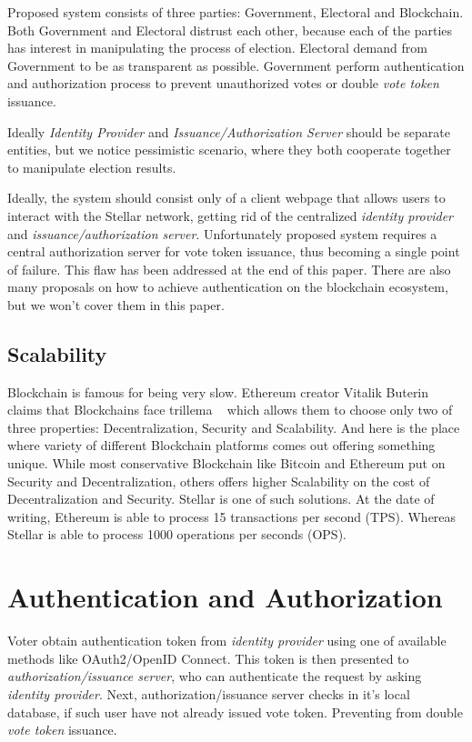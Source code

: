 \documentclass[runningheads]{llncs}
\begin{document}
Proposed system consists of three parties: Government, Electoral and Blockchain. Both Government and Electoral distrust each other, because each of the parties has interest in manipulating the process of election. Electoral demand from Government to be as transparent as possible. Government perform authentication and authorization process to prevent unauthorized votes or double \textit{vote token} issuance.

Ideally \textit{Identity Provider} and \textit{Issuance/Authorization Server} should be separate entities, but we notice pessimistic scenario, where they both cooperate together to manipulate election results.

Ideally, the system should consist only of a client webpage that allows users to interact with the Stellar network, getting rid of the centralized \textit{identity provider} and \textit{issuance/authorization server}. Unfortunately proposed system requires a central authorization server for vote token issuance, thus becoming a single point
of failure. This flaw has been addressed at the end of this paper. There are also many proposals on how to achieve authentication on the blockchain ecosystem, but we won't cover them in this paper.

\subsection{Scalability}

Blockchain is famous for being very slow. Ethereum creator Vitalik Buterin claims that Blockchains face trillema ~\cite{ethereum} which allows them to choose only two of three properties: Decentralization, Security and Scalability. And here is the place where variety of different Blockchain platforms comes out offering something unique. While most conservative Blockchain like Bitcoin and Ethereum put on Security and Decentralization, others offers higher Scalability on the cost of Decentralization and Security. Stellar is one of such solutions. 
At the date of writing, Ethereum is able to process 15 transactions per second (TPS). Whereas Stellar is able to process 1000 operations per seconds (OPS). 

\section{Authentication and Authorization}
Voter obtain authentication token from \textit{identity provider} using one of available methods like OAuth2/OpenID Connect. This token is then presented to \textit{authorization/issuance server}, who can authenticate the request by asking \textit{identity provider}. Next, authorization/issuance server checks in it's local database, if such user have not already issued vote token. Preventing from double \textit{vote token} issuance.
\end{document}
